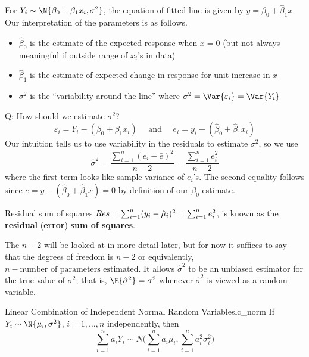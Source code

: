 For $ Y_i \sim \N{\beta_0+\beta_1x_i,\sigma^2} $,
the equation of fitted line
is given by $ y=\hat{\beta}_0+\hat{\beta}_1x $. Our
interpretation of the parameters is as follows.
\begin{itemize}
    \item $ \hat{\beta}_0 $ is the estimate
          of the expected response when $ x=0 $ (but not always
          meaningful if outside range of $ x_i $'s in data)
    \item $ \hat{\beta}_1 $ is the estimate of
          expected change in response for unit increase in $ x $
    \item $ \sigma^2 $ is the
          ``variability around the line''
          where $ \sigma^2=\Var{\varepsilon_i}=\Var{Y_i} $
\end{itemize}
Q\@: How should we estimate $ \sigma^2 $?
\[ \varepsilon_i=Y_i-(\beta_0+\beta_1x_i)
    \quad\text{ and }\quad e_i=y_i-(\hat{\beta}_0+\hat{\beta}_1x_i) \]
Our intuition tells us to use variability in the residuals to estimate
$ \sigma^2 $, so we use
\[ \hat{\sigma}^2
    =\frac{\sum_{i=1}^{n} (e_i-\bar{e})^2}{n-2}=
    \frac{\sum_{i=1}^{n} e_i^2}{n-2}  \]
where the first term looks like sample variance of $ e_i $'s.
The second equality follows since
$ \bar{e}=\bar{y}-(\hat{\beta}_0+\hat{\beta}_1\bar{x})=0 $
by definition of our $ \beta_0 $ estimate.
\begin{Definition}{Residual sum of squares}{}
    $ \relax{Res}=
        \sum_{i=1}^{n} (y_i-\hat{\mu}_i)^2=
        \sum_{i=1}^{n} e_i^2 $,
    is known as the \textbf{residual} (\textbf{error})
    \textbf{sum of squares}.
\end{Definition}
\begin{Remark}{}{}
    The $ n-2 $ will be looked at in more detail later, but for now
    it suffices to say that the degrees of freedom
    is $ n-2 $ or equivalently, $ n- \text{number of parameters
            estimated}$. It allows $ \hat{\sigma}^2 $ to be an unbiased estimator
    for the true value of $ \sigma^2 $; that is,
    $ \E{\hat{\sigma}^2}=\sigma^2 $
    whenever $ \hat{\sigma}^2 $ is viewed as a random variable.
\end{Remark}
\begin{Theorem}{Linear Combination of Independent Normal Random Variables}{lc_norm}
    If $ Y_i \sim \N{\mu_i,\sigma^2} $, $ i=1,\ldots,n $
    independently, then
    \[ \sum_{i=1}^{n} a_i Y_i \sim N
        \biggl( \sum_{i=1}^{n} a_i\mu_i,\sum_{i=1}^{n} a_i^2\sigma_i^2 \biggr) \]
\end{Theorem}
